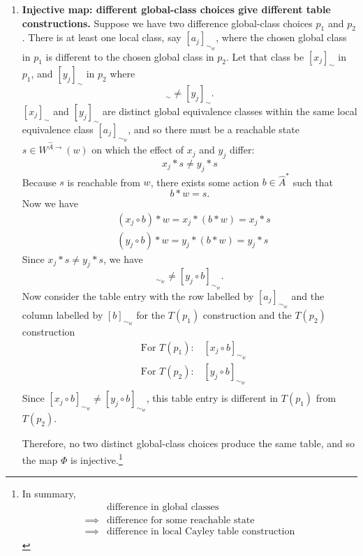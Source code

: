 \begin{proofE}
\begin{enumerate}
    \item \textbf{Injective map: different global-class choices give different table constructions.}
    Suppose we have two difference global-class choices $p_{1}$ and $p_{2}$.
    There is at least one local class, say $[a_{j}]_{\sim_{w}}$, where the chosen global class in $p_{1}$ is different to the chosen global class in $p_{2}$.
    Let that class be $[x_{j}]_{\sim}$ in $p_{1}$, and $[y_{j}]_{\sim}$ in $p_{2}$ where
    \begin{equation}
        [x_{j}]_{\sim} \neq [y_{j}]_{\sim}.
    \end{equation}
    $[x_{j}]_{\sim}$ and $[y_{j}]_{\sim}$ are distinct global equivalence classes within the same local equivalence class $[a_{j}]_{\sim_{w}}$, and so there must be a reachable state $s \in W^{\hat{A}\to}(w)$ on which the effect of $x_{j}$ and $y_{j}$ differ:
    \begin{equation}
        x_{j} \ast s \neq y_{j} \ast s
    \end{equation}
    Because $s$ is reachable from $w$, there exists some action $b \in \hat{A}^{*}$ such that
    \begin{equation}
        b \ast w = s.
    \end{equation}
    Now we have
    \begin{align}
        & (x_{j} \circ b) \ast w = x_{j} \ast (b \ast w) = x_{j} \ast s \\
        & (y_{j} \circ b) \ast w = y_{j} \ast (b \ast w) = y_{j} \ast s
    \end{align}
    Since $x_{j} \ast s \neq y_{j} \ast s$, we have
    \begin{equation}
        [x_{j} \circ b]_{\sim_{w}} \neq [y_{j} \circ b]_{\sim_{w}} .
    \end{equation}
    Now consider the table entry with the row labelled by $[a_{j}]_{\sim_{w}}$ and the column labelled by $[b]_{\sim_{w}}$ for the $T(p_{1})$ construction and the $T(p_{2})$ construction
    \begin{align}
        & \text{For $T(p_{1})$:} \quad [x_{j} \circ b]_{\sim_{w}} \\
        & \text{For $T(p_{2})$:} \quad [y_{j} \circ b]_{\sim_{w}} \\
    \end{align}
    Since $[x_{j} \circ b]_{\sim_{w}} \neq [y_{j} \circ b]_{\sim_{w}}$, this table entry is different in $T(p_{1})$ from $T(p_{2})$.
    
    Therefore, no two distinct global-class choices produce the same table, and so the map $\Phi$ is injective.\footnote{
    In summary,
    \begin{equation}
    \begin{aligned}
        & \text{difference in global classes} \\
        \implies & \text{difference for some reachable state} \\
        \implies & \text{difference in local Cayley table construction}
    \end{aligned}
    \end{equation}
    }


\end{enumerate}
\end{proofE}
